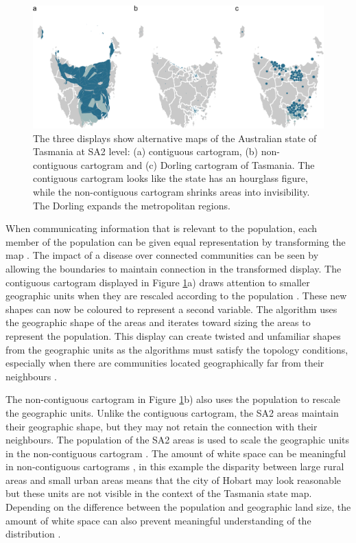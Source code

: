 \begin{Schunk}
\begin{figure}
\includegraphics[width=0.95\linewidth]{kobakian-cook_files/figure-latex/tas_displays-1} \caption[The three displays show alternative maps of the Australian state of Tasmania at SA2 level]{The three displays show alternative maps of the Australian state of Tasmania at SA2 level: (a) contiguous cartogram, (b) non-contiguous cartogram and (c) Dorling cartogram of Tasmania. The contiguous cartogram looks like the state has an hourglass figure, while the non-contiguous cartogram shrinks areas into invisibility. The Dorling expands the metropolitan regions.}\label{fig:tas_displays}
\end{figure}
\end{Schunk}

When communicating information that is relevant to the population, each
member of the population can be given equal representation by
transforming the map \citep{TVSSS}. The impact of a disease over
connected communities can be seen by allowing the boundaries to maintain
connection in the transformed display. The contiguous cartogram
displayed in Figure \ref{fig:tas_displays}a) draws attention to smaller
geographic units when they are rescaled according to the population
\citep{DMAHP}. These new shapes can now be coloured to represent a
second variable. The algorithm uses the geographic shape of the areas
and iterates toward sizing the areas to represent the population. This
display can create twisted and unfamiliar shapes from the geographic
units as the algorithms must satisfy the topology conditions, especially
when there are communities located geographically far from their
neighbours \citep{TVSSS}.

The non-contiguous cartogram in Figure \ref{fig:tas_displays}b) also
uses the population to rescale the geographic units. Unlike the
contiguous cartogram, the SA2 areas maintain their geographic shape, but
they may not retain the connection with their neighbours. The population
of the SA2 areas is used to scale the geographic units in the
non-contiguous cartogram \citep{NAC}. The amount of white space can be
meaningful in non-contiguous cartograms \citep{ECGC}, in this example
the disparity between large rural areas and small urban areas means that
the city of Hobart may look reasonable but these units are not visible
in the context of the Tasmania state map. Depending on the difference
between the population and geographic land size, the amount of white
space can also prevent meaningful understanding of the distribution
\citep{TVSSS}.

